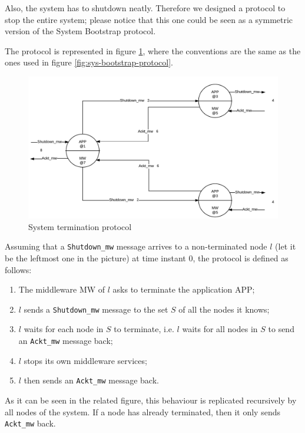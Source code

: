 Also, the system has to shutdown neatly. Therefore we designed a protocol to
stop the entire system; please notice that this one could be seen as a
symmetric version of the System Bootstrap protocol.

The protocol is represented in figure \ref{fig:sys-termination-protocol}, where
the conventions are the same as the ones used in figure
\ref{fig:sys-bootstrap-protocol}.

\begin{figure}[H]
  \centering
  \includegraphics[width=\columnwidth]{sections/images/solution/termination.pdf}
  \caption{System termination protocol}
  \label{fig:sys-termination-protocol}
\end{figure}

Assuming that a \texttt{Shutdown\_mw} message arrives to a non-terminated node
$l$ (let it be the leftmost one in the picture) at time instant 0, the protocol
is defined as follows:

\begin{enumerate}
  \item The middleware MW of $l$ asks to terminate the application APP;
  \item $l$ sends a \texttt{Shutdown\_mw} message to the set
    $S$ of all the nodes it knows;
  \item $l$ waits for each node in $S$ to terminate, i.e. $l$ waits for all
    nodes in $S$ to send an \texttt{Ackt\_mw} message back;
  \item $l$ stops its own middleware services;
  \item $l$ then sends an \texttt{Ackt\_mw} message back.
\end{enumerate}

As it can be seen in the related figure, this behaviour is replicated
recursively by all nodes of the system. If a node has already terminated, then
it only sends \texttt{Ackt\_mw} back.
